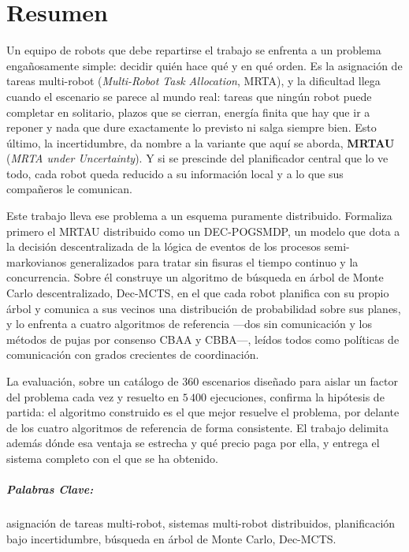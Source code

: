\documentclass[a4paper,oneside,12pt]{book}
\theoremstyle{definition}
\begin{document}
\chapter{Resumen}
\begin{small}
Un equipo de robots que debe repartirse el trabajo se enfrenta a un problema engañosamente simple: decidir quién hace qué y en qué orden. Es la asignación de tareas multi-robot (\textit{Multi-Robot Task Allocation}, MRTA), y la dificultad llega cuando el escenario se parece al mundo real: tareas que ningún robot puede completar en solitario, plazos que se cierran, energía finita que hay que ir a reponer y nada que dure exactamente lo previsto ni salga siempre bien. Esto último, la incertidumbre, da nombre a la variante que aquí se aborda, \textbf{MRTAU} (\textit{MRTA under Uncertainty}). Y si se prescinde del planificador central que lo ve todo, cada robot queda reducido a su información local y a lo que sus compañeros le comunican.

Este trabajo lleva ese problema a un esquema puramente distribuido. Formaliza primero el MRTAU distribuido como un DEC-POGSMDP, un modelo que dota a la decisión descentralizada de la lógica de eventos de los procesos semi-markovianos generalizados para tratar sin fisuras el tiempo continuo y la concurrencia. Sobre él construye un algoritmo de búsqueda en árbol de Monte Carlo descentralizado, Dec-MCTS, en el que cada robot planifica con su propio árbol y comunica a sus vecinos una distribución de probabilidad sobre sus planes, y lo enfrenta a cuatro algoritmos de referencia ---dos sin comunicación y los métodos de pujas por consenso CBAA y CBBA---, leídos todos como políticas de comunicación con grados crecientes de coordinación.

La evaluación, sobre un catálogo de $360$ escenarios diseñado para aislar un factor del problema cada vez y resuelto en $5\,400$ ejecuciones, confirma la hipótesis de partida: el algoritmo construido es el que mejor resuelve el problema, por delante de los cuatro algoritmos de referencia de forma consistente. El trabajo delimita además dónde esa ventaja se estrecha y qué precio paga por ella, y entrega el sistema completo con el que se ha obtenido.

\paragraph{Palabras Clave:} asignación de tareas multi-robot, sistemas multi-robot distribuidos, planificación bajo incertidumbre, búsqueda en árbol de Monte Carlo, Dec-MCTS.
\end{small}
\end{document}
